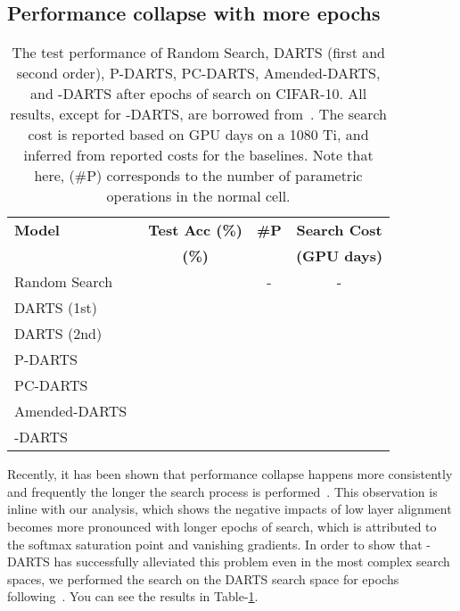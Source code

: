 \documentclass{article} \usepackage{fancyhdr, iclr2023_conference, times}
\newcommand{\mydarts}{-DARTS\xspace}
\newcommand{\lambdafn}{layer alignment\xspace}
\begin{document}
\subsection{Performance collapse with more epochs}
\label{appndx:more-epochs}
\par \begin{table}[t]
\centering
\caption{The test performance of Random Search, DARTS (first and second order), P-DARTS, PC-DARTS, Amended-DARTS, and \mydarts after  epochs of search on CIFAR-10. All results, except for \mydarts, are borrowed from~\citep{DBLP:journals/ijcv/ChenXWT21}. The search cost is reported based on GPU days on a 1080 Ti, and inferred from reported costs for the baselines. Note that here, (\#P) corresponds to the number of parametric operations in the normal cell.} 
\label{table:200epochs}
\begin{tabular}{l|c|c|c}
\textbf{Model} & \textbf{Test Acc (\%)} & \textbf{\#P} & \textbf{Search Cost} \\ 
&\textbf{(\%)} & & \textbf{(GPU days)}\\\hline
    Random Search~\citep{DBLP:journals/corr/abs-1910-11831} &  & - & - \\\hline 
    DARTS (1st)~\citep{DBLP:conf/iclr/LiuSY19} &  &  &  \\
    DARTS (2nd)~\citep{DBLP:conf/iclr/LiuSY19} &  &  &  \\
    P-DARTS~\citep{DBLP:journals/ijcv/ChenXWT21} &  &  &  \\
    PC-DARTS~\citep{DBLP:conf/iclr/XuX0CQ0X20} &  &  & \\
    Amended-DARTS~\citep{DBLP:journals/corr/abs-1910-11831} &  &  &  \\ \hline
    \mydarts &  &  &  \\
\end{tabular}
\end{table}
Recently, it has been shown that performance collapse happens more consistently and frequently the longer the search process is performed~\citep{DBLP:journals/corr/abs-1910-11831}. This observation is inline with our analysis, which shows the negative impacts of low \lambdafn becomes more pronounced with longer epochs of search, which is attributed to the softmax saturation point and vanishing gradients. In order to show that \mydarts has successfully alleviated this problem even in the most complex search spaces, we performed the search on the DARTS search space for  epochs following~\citep{DBLP:journals/corr/abs-1910-11831}. You can see the results in Table-\ref{table:200epochs}.
\end{document}
